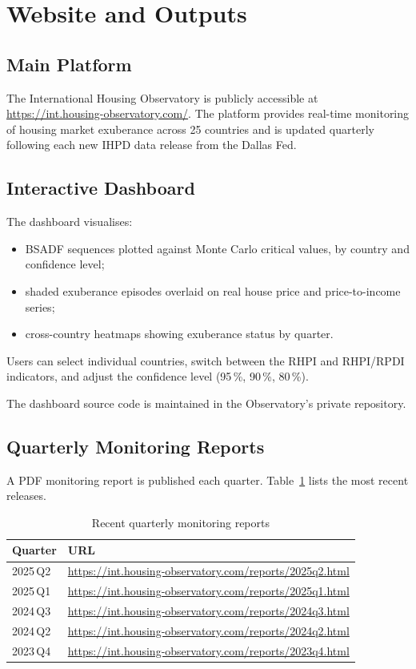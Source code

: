 \section{Website and Outputs}
\label{sec:website}

\subsection{Main Platform}

The International Housing Observatory is publicly accessible at
\url{https://int.housing-observatory.com/}. The platform provides real-time
monitoring of housing market exuberance across 25 countries and is updated
quarterly following each new IHPD data release from the Dallas Fed.

\subsection{Interactive Dashboard}

The dashboard visualises:
\begin{itemize}
  \item BSADF sequences plotted against Monte Carlo critical values,
        by country and confidence level;
  \item shaded exuberance episodes overlaid on real house price and
        price-to-income series;
  \item cross-country heatmaps showing exuberance status by quarter.
\end{itemize}
Users can select individual countries, switch between the RHPI and RHPI/RPDI
indicators, and adjust the confidence level (95\,\%, 90\,\%, 80\,\%).

The dashboard source code is maintained in the Observatory's private
repository.

\subsection{Quarterly Monitoring Reports}

A PDF monitoring report is published each quarter. Table~\ref{tab:reports}
lists the most recent releases.

\begin{table}[ht]
  \centering
  \caption{Recent quarterly monitoring reports}
  \label{tab:reports}
  \begin{tabular}{ll}
    \toprule
    Quarter & URL \\
    \midrule
    2025\,Q2 & \url{https://int.housing-observatory.com/reports/2025q2.html} \\
    2025\,Q1 & \url{https://int.housing-observatory.com/reports/2025q1.html} \\
    2024\,Q3 & \url{https://int.housing-observatory.com/reports/2024q3.html} \\
    2024\,Q2 & \url{https://int.housing-observatory.com/reports/2024q2.html} \\
    2023\,Q4 & \url{https://int.housing-observatory.com/reports/2023q4.html} \\
    \bottomrule
  \end{tabular}
\end{table}

